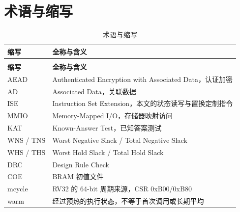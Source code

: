 \chapter{术语与缩写}
\renewcommand{\thesubsection}{\thechapter.\arabic{subsection}}

{\small
\renewcommand{\thetable}{A-1}
\begin{longtable}{@{}>{\raggedright\arraybackslash}p{}>{\raggedright\arraybackslash}p{}@{}}
\caption{术语与缩写}\label{tab:A-1}\\
\toprule
\textbf{缩写} & \textbf{全称与含义} \\
\midrule
\endfirsthead
\multicolumn{2}{@{}l}{\footnotesize 续表 A-1}\\
\toprule
\textbf{缩写} & \textbf{全称与含义} \\
\midrule
\endhead
AEAD & Authenticated Encryption with Associated Data，认证加密 \\
AD & Associated Data，关联数据 \\
ISE & Instruction Set Extension，本文的状态读写与置换定制指令 \\
MMIO & Memory-Mapped I/O，存储器映射访问 \\
KAT & Known-Answer Test，已知答案测试 \\
WNS / TNS & Worst Negative Slack / Total Negative Slack \\
WHS / THS & Worst Hold Slack / Total Hold Slack \\
DRC & Design Rule Check \\
COE & BRAM 初值文件 \\
mcycle & RV32 的 64-bit 周期来源，CSR 0xB00/0xB80 \\
warm & 经过预热的执行状态，不等于首次调用或长期平均 \\
\bottomrule
\end{longtable}
}
